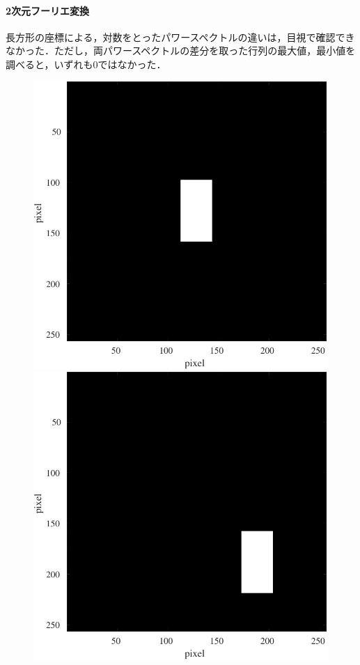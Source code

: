 \paragraph{2次元フーリエ変換}
長方形の座標による，対数をとったパワースペクトルの違いは，目視で確認できなかった．ただし，両パワースペクトルの差分を取った行列の最大値，最小値を調べると，いずれも\(0\)ではなかった．
\begin{figure}[H]
    \centering
    \begin{minipage}[b]{.2\textwidth}
        \centering
        \includegraphics[keepaspectratio,width=\textwidth]{../../Figures/08_31_rec1.pdf}
    \end{minipage}
    \begin{minipage}[b]{.2\textwidth}
        \centering
        \includegraphics[keepaspectratio,width=\textwidth]{../../Figures/08_32_rec2.pdf}

\end{minipage}
\end{figure}
